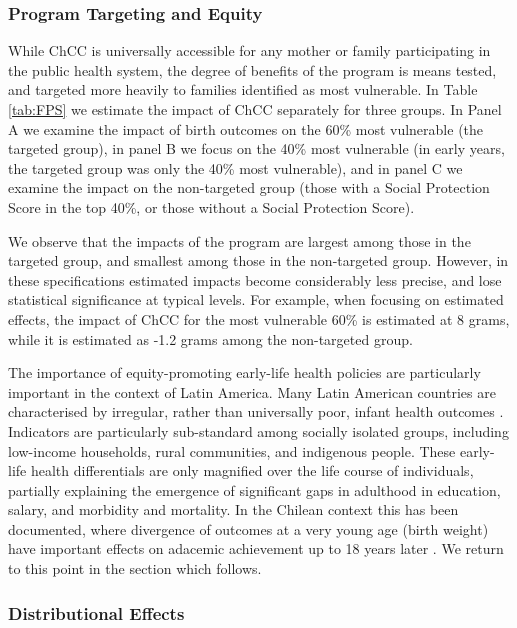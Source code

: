 \documentclass[12pt]{article}
\begin{document}
\begin{spacing}{1.4}
\subsubsection{Program Targeting and Equity}
While ChCC is universally accessible for any mother or family
participating in the public health system, the degree of benefits
of the program is means tested, and targeted more heavily to
families identified as most vulnerable.  In Table \ref{tab:FPS}
we estimate the impact of ChCC separately for three groups.
In Panel A we examine the impact of birth outcomes on the
60\% most vulnerable (the targeted group), in panel B we
focus on the 40\% most vulnerable (in early years, the targeted
group was only the 40\% most vulnerable), and in panel C we
examine the impact on the non-targeted group (those with a
Social Protection Score in the top 40\%, or those without a
Social Protection Score).

We observe that the impacts of the program are largest among
those in the targeted group, and smallest among those in the
non-targeted group.  However, in these specifications estimated
impacts become considerably less precise, and lose statistical
significance at typical levels.  For example, when focusing on
estimated effects, the impact of ChCC for the most vulnerable
60\% is estimated at 8 grams, while it is estimated as -1.2 grams
among the non-targeted group.

The importance of equity-promoting early-life health policies
are particularly important in the context of Latin America. Many
Latin American countries are characterised by irregular, rather
than universally poor, infant health outcomes
\citep{Belizanetal2007}.  Indicators are particularly sub-standard
among socially isolated groups, including low-income households,
rural communities, and indigenous people.  These early-life health
differentials are only magnified over the life course of
individuals, partially explaining the emergence of significant
gaps in adulthood in education, salary, and morbidity and mortality.
In the Chilean context this has been documented, where divergence
of outcomes at a very young age (birth weight) have important
effects on adacemic achievement up to 18 years later
\citep{Bharadwajetal2017}.  We return to this point in the
section which follows.

\subsubsection{Distributional Effects}

\end{spacing}
\end{document}
